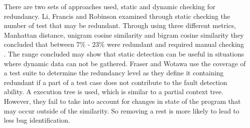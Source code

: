 There are two sets of approaches used, static and dynamic checking for redundancy. Li, Francis and Robinson \cite{li2008static} examined through static checking the number of test that may be redundant. Through using three different metrics, Manhattan distance, unigram cosine similarity and bigram cosine similarity they concluded that between 7\% - 23\% were redundant and required manual checking . The range concluded may show that static detection can be useful in situations where dynamic data can not be gathered. Fraser and Wotawa \cite{fraser2007redundancy} use the coverage of a test suite to determine the redundancy level as they define it containing redundant if a part of a test case does not contribute to the fault detection ability. A execution tree is used, which is similar to a partial context tree. However, they fail to take into account for changes in state of the program that may occur outside of the similarity. So removing a rest is more likely to lead to less bug identification.